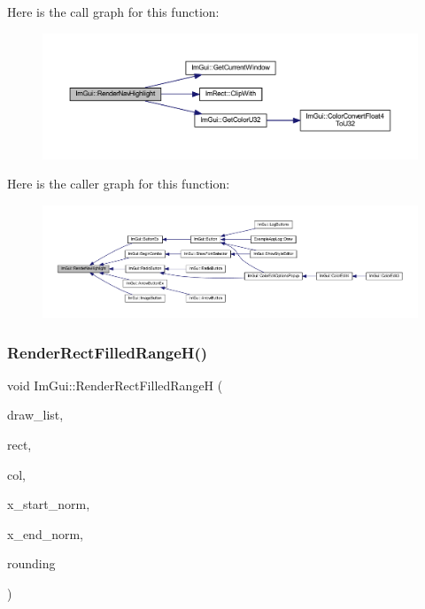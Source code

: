 Here is the call graph for this function\+:
\nopagebreak
\begin{figure}[H]
\begin{center}
\leavevmode
\includegraphics[width=350pt]{namespace_im_gui_afc84af0481214603f058b6ee31d20855_cgraph}
\end{center}
\end{figure}
Here is the caller graph for this function\+:
\nopagebreak
\begin{figure}[H]
\begin{center}
\leavevmode
\includegraphics[width=350pt]{namespace_im_gui_afc84af0481214603f058b6ee31d20855_icgraph}
\end{center}
\end{figure}
\mbox{\label{namespace_im_gui_af311762331bda4508b25e05f6afc7f45}} 
\subsubsection{\texorpdfstring{Render\+Rect\+Filled\+Range\+H()}{RenderRectFilledRangeH()}}
{\footnotesize\ttfamily void Im\+Gui\+::\+Render\+Rect\+Filled\+RangeH (\begin{DoxyParamCaption}\item[{\mbox{\hyperlink{struct_im_draw_list}{Im\+Draw\+List}} $\ast$}]{draw\+\_\+list,  }\item[{const \mbox{\hyperlink{struct_im_rect}{Im\+Rect}} \&}]{rect,  }\item[{\mbox{\hyperlink{imgui_8h_a118cff4eeb8d00e7d07ce3d6460eed36}{Im\+U32}}}]{col,  }\item[{float}]{x\+\_\+start\+\_\+norm,  }\item[{float}]{x\+\_\+end\+\_\+norm,  }\item[{float}]{rounding }\end{DoxyParamCaption})}

